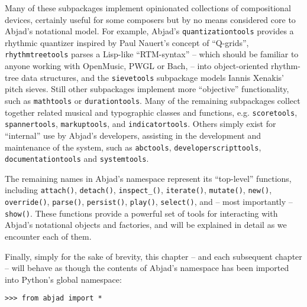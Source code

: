 \noindent Many of these subpackages implement opinionated collections of
compositional devices, certainly useful for some composers but by no means
considered core to Abjad's notational model. For example, Abjad's
\texttt{quantizationtools} provides a rhythmic quantizer inspired by Paul
Nauert's concept of \enquote{Q-grids}\cite{nauert1997timespan},
\texttt{rhythmtreetools} parses a Lisp-like \enquote{RTM-syntax} -- which
should be familiar to anyone working with OpenMusic\cite{assayag1999sw},
PWGL\cite{laurson2009qf, kuuskankare2004recent} or Bach\cite{agostini2013real},
-- into object-oriented rhythm-tree data structures, and the
\texttt{sievetools} subpackage models Iannis Xenakis' pitch
sieves\cite{xenakis1992formalized}. Still other subpackages implement more
\enquote{objective} functionality, such as \texttt{mathtools} or
\texttt{durationtools}. Many of the remaining subpackages collect together
related musical and typographic classes and functions, e.g.
\texttt{scoretools}, \texttt{spannertools}, \texttt{markuptools}, and
\texttt{indicatortools}. Others simply exist for \enquote{internal} use by
Abjad's developers, assisting in the development and maintenance of the system,
such as \texttt{abctools}, \texttt{developerscripttools},
\texttt{documentationtools} and \texttt{systemtools}.

The remaining names in Abjad's namespace represent its \enquote{top-level}
functions, including \texttt{attach()}, \texttt{detach()},
\texttt{inspect\_()}, \texttt{iterate()}, \texttt{mutate()}, \texttt{new()},
\texttt{override()}, \texttt{parse()}, \texttt{persist()}, \texttt{play()},
\texttt{select()}, and -- most importantly --
\texttt{show()}. These functions provide a powerful set of tools for
interacting with Abjad's notational objects and factories, and will be
explained in detail as we encounter each of them.

Finally, simply for the sake of brevity, this chapter -- and each subsequent
chapter -- will behave as though the contents of Abjad's namespace has been
imported into Python's global namespace:

\begin{comment}
<abjad>
from abjad import *
</abjad>
\end{comment}

\begin{abjadbookoutput}
\begin{singlespacing}
\vspace{-0.5\baselineskip}
\begin{verbatim}
>>> from abjad import *
\end{verbatim}
\end{singlespacing}
\end{abjadbookoutput}

